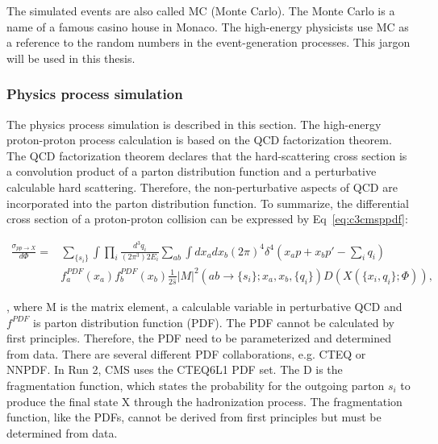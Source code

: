 The simulated events are also called MC (Monte Carlo). The Monte Carlo is a name of a famous casino house in Monaco. The high-energy physicists use MC as a reference to the random numbers in the event-generation processes. This jargon will be used in this thesis. 

\subsubsection{Physics process simulation}

The physics process simulation is described in this section. The high-energy proton-proton process calculation is based on the QCD factorization theorem\cite{Collins:1989gx}. The QCD factorization theorem declares that the hard-scattering cross section is a convolution product of a parton distribution function and a perturbative calculable hard scattering. Therefore, the non-perturbative aspects of QCD are incorporated into the parton distribution function. To summarize, the differential cross section of a proton-proton collision can be expressed by Eq~\ref{eq:c3cmsppdf}:

\begin{equation}
  \begin{split}
		\frac{\sigma_{pp \rightarrow X}}{d\Phi}=& \sum_{\{s_{i}\}} \int \prod_{i} \frac{d^{3}q_{i}}{(2\pi^{3})2E_{i}} \sum_{ab} \int dx_{a}dx_{b}(2\pi)^{4}\delta^{4}(x_{a}p+x_{b}p\prime-\sum_{i}q_{i}) \\
	                                          & f_{a}^{PDF}(x_{a})f_{b}^{PDF}(x_{b}) \frac{1}{2\hat{s}}|M|^{2}(ab \rightarrow \{s_{i}\};x_{a},x_{b},\{q_{i}\}) D(X(\{x_{i},q_{i}\};\Phi)), 
  \end{split}
 \label{eq:c3cmsppdf}
\end{equation}

, where M is the matrix element, a calculable variable in perturbative QCD and $f^{PDF}$ is parton distribution function (PDF)\cite{Butterworth:2015oua}. The PDF cannot be calculated by first principles. Therefore, the PDF need to be parameterized and determined from data. There are several different PDF collaborations, e.g. CTEQ\cite{Lai:2010nw} or NNPDF\cite{Ball:2014uwa}. In Run 2, CMS uses the CTEQ6L1 PDF set. The D is the fragmentation function, which states the probability for the outgoing parton $s_{i}$ to produce the final state X through the hadronization process. The fragmentation function, like the PDFs, cannot be derived from first principles but must be determined from data.

